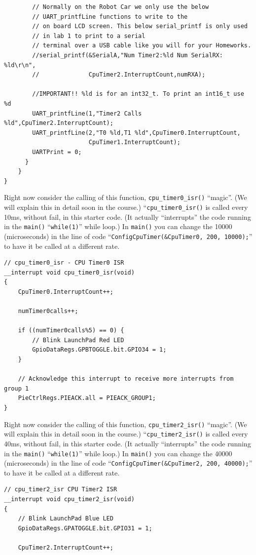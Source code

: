 \documentclass[11pt]{article}
\begin{document}
%
\begin{verbatim}
        // Normally on the Robot Car we only use the below
        // UART_printfLine functions to write to the
        // on board LCD screen. This below serial_printf is only used
        // in lab 1 to print to a serial
        // terminal over a USB cable like you will for your Homeworks.
        //serial_printf(&SerialA,"Num Timer2:%ld Num SerialRX: %ld\r\n",
        //              CpuTimer2.InterruptCount,numRXA);

        //IMPORTANT!! %ld is for an int32_t. To print an int16_t use %d
        UART_printfLine(1,"Timer2 Calls %ld",CpuTimer2.InterruptCount);
        UART_printfLine(2,"T0 %ld,T1 %ld",CpuTimer0.InterruptCount,
                        CpuTimer1.InterruptCount);
        UARTPrint = 0;
      }
    }
}
\end{verbatim}
%
Right now consider the calling of this function, \texttt{cpu_timer0_isr()} “magic”. (We will explain this in detail soon in the course.) “\texttt{cpu_timer0_isr()} is called every 10ms, without fail, in this starter code. (It actually “interrupts” the code running in the \texttt{main()} “\texttt{while(1)}” while loop.) In \texttt{main()} you can change the 10000 (microseconds) in the line of code “\texttt{ConfigCpuTimer(&CpuTimer0, 200, 10000);}” to have it be called at a different rate.
%
\begin{verbatim}
// cpu_timer0_isr - CPU Timer0 ISR
__interrupt void cpu_timer0_isr(void)
{
    CpuTimer0.InterruptCount++;

    numTimer0calls++;

    if ((numTimer0calls%5) == 0) {
        // Blink LaunchPad Red LED
        GpioDataRegs.GPBTOGGLE.bit.GPIO34 = 1;
    }

    // Acknowledge this interrupt to receive more interrupts from group 1
    PieCtrlRegs.PIEACK.all = PIEACK_GROUP1;
}
\end{verbatim}
%
Right now consider the calling of this function, \texttt{cpu_timer2_isr()} “magic”. (We will explain this in detail soon in the course.) “\texttt{cpu_timer2_isr()} is called every 40ms, without fail, in this starter code. (It actually “interrupts” the code running in the \texttt{main()} “\texttt{while(1)}” while loop.) In \texttt{main()} you can change the 40000 (microseconds) in the line of code “\texttt{ConfigCpuTimer(&CpuTimer2, 200, 40000);}” to have it be called at a different rate.
%
\begin{verbatim}
// cpu_timer2_isr CPU Timer2 ISR
__interrupt void cpu_timer2_isr(void)
{
    // Blink LaunchPad Blue LED
    GpioDataRegs.GPATOGGLE.bit.GPIO31 = 1;

    CpuTimer2.InterruptCount++;
\end{verbatim}
\end{document}
